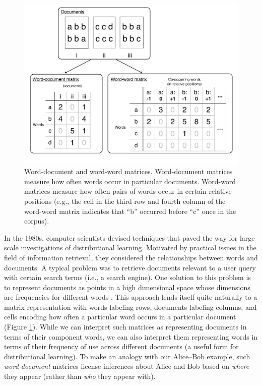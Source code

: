 \documentclass[man,floatsintext]{apa6}
\begin{document}
\begin{figure}[t]
  \begin{center}
    \includegraphics[width=0.9\linewidth]{matrices}
  \end{center}
  \caption{Word-document and word-word matrices. Word-document matrices measure how often words occur in particular documents. Word-word matrices measure how often pairs of words occur in certain relative positions (e.g., the cell in the third row and fourth column of the word-word matrix indicates that ``b'' occurred before ``c'' once in the corpus).}
  \label{matrices}
\end{figure}

In the 1980s, computer scientists devised techniques that paved the way for large scale investigations of distributional learning. Motivated by practical issues in the field of information retrieval, they considered the relationships between words and documents. A typical problem was to retrieve documents relevant to a user query with certain search terms (i.e., a search engine). One solution to this problem is to represent documents as points in a high dimensional space whose dimensions are frequencies for different words \citep{salton1983}. This approach lends itself quite naturally to a matrix representation with words labeling rows, documents labeling columns, and cells encoding how often a particular word occurs in a particular document (Figure \ref{matrices}). While we can interpret such matrices as representing documents in terms of their component words, we can also interpret them representing words in terms of their frequency of use across different documents (a useful form for distributional learning). To make an analogy with our Alice--Bob example, such \emph{word-document} matrices license inferences about Alice and Bob based on \emph{where} they appear (rather than \emph{who} they appear with).
\end{document}
